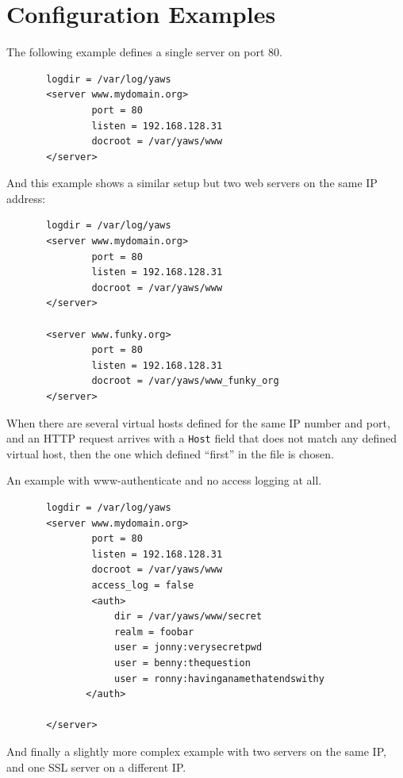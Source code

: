 \documentclass[11pt,oneside,english]{book}
\begin{document}
\section{Configuration Examples}

       The  following  example  defines a single server on
       port 80.

\begin{verbatim}
       logdir = /var/log/yaws
       <server www.mydomain.org>
               port = 80
               listen = 192.168.128.31
               docroot = /var/yaws/www
       </server>
\end{verbatim}

       And this example shows a similar setup but two web
       servers on the same IP address:

\begin{verbatim}
       logdir = /var/log/yaws
       <server www.mydomain.org>
               port = 80
               listen = 192.168.128.31
               docroot = /var/yaws/www
       </server>

       <server www.funky.org>
               port = 80
               listen = 192.168.128.31
               docroot = /var/yaws/www_funky_org
       </server>
\end{verbatim}


When there are several virtual hosts defined for the same IP number
and port, and an HTTP request arrives with a \verb+Host+ field that
does not match any defined virtual host, then the one which defined
``first'' in the file is chosen.

An example with www-authenticate and no access logging at all.

\begin{verbatim}
       logdir = /var/log/yaws
       <server www.mydomain.org>
               port = 80
               listen = 192.168.128.31
               docroot = /var/yaws/www
               access_log = false
               <auth>
                   dir = /var/yaws/www/secret
                   realm = foobar
                   user = jonny:verysecretpwd
                   user = benny:thequestion
                   user = ronny:havinganamethatendswithy
              </auth>

       </server>
\end{verbatim}

       And  finally  a  slightly more complex example with
       two servers on the same IP, and one SSL server on a
       different IP.
\end{document}
